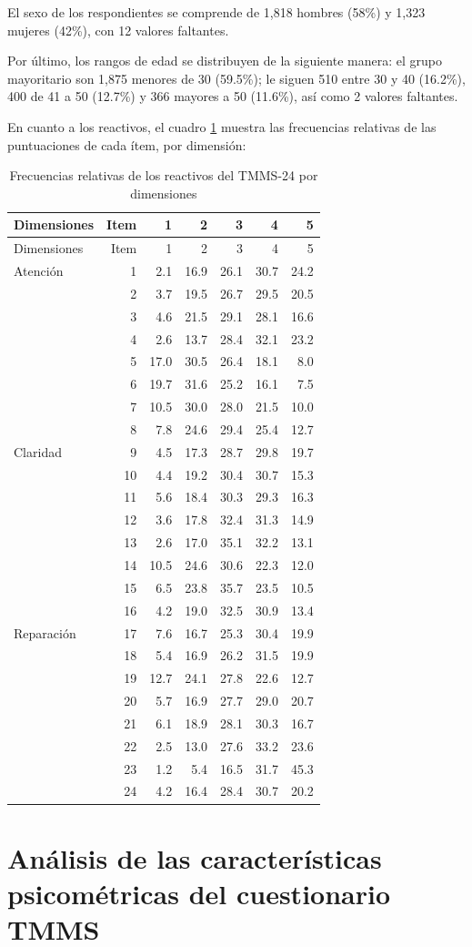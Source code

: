 \documentclass[
  10pt,
  spanish,
]{article}
\begin{document}
El sexo de los respondientes se comprende de 1,818 hombres (58\%) y
1,323 mujeres (42\%), con 12 valores faltantes.

Por último, los rangos de edad se distribuyen de la siguiente manera: el
grupo mayoritario son 1,875 menores de 30 (59.5\%); le siguen 510 entre
30 y 40 (16.2\%), 400 de 41 a 50 (12.7\%) y 366 mayores a 50 (11.6\%),
así como 2 valores faltantes.

En cuanto a los reactivos, el cuadro \ref{tab:tab_tmms} muestra las
frecuencias relativas de las puntuaciones de cada ítem, por dimensión:

\begin{longtable}[]{@{}lrrrrrr@{}}
\caption{Frecuencias relativas de los reactivos del TMMS-24 por
dimensiones\label{tab:tab_tmms}}\tabularnewline
\toprule
Dimensiones & Item & 1 & 2 & 3 & 4 & 5\tabularnewline
\midrule
\endfirsthead
\toprule
Dimensiones & Item & 1 & 2 & 3 & 4 & 5\tabularnewline
\midrule
\endhead
Atención & 1 & 2.1 & 16.9 & 26.1 & 30.7 & 24.2\tabularnewline
& 2 & 3.7 & 19.5 & 26.7 & 29.5 & 20.5\tabularnewline
& 3 & 4.6 & 21.5 & 29.1 & 28.1 & 16.6\tabularnewline
& 4 & 2.6 & 13.7 & 28.4 & 32.1 & 23.2\tabularnewline
& 5 & 17.0 & 30.5 & 26.4 & 18.1 & 8.0\tabularnewline
& 6 & 19.7 & 31.6 & 25.2 & 16.1 & 7.5\tabularnewline
& 7 & 10.5 & 30.0 & 28.0 & 21.5 & 10.0\tabularnewline
& 8 & 7.8 & 24.6 & 29.4 & 25.4 & 12.7\tabularnewline
Claridad & 9 & 4.5 & 17.3 & 28.7 & 29.8 & 19.7\tabularnewline
& 10 & 4.4 & 19.2 & 30.4 & 30.7 & 15.3\tabularnewline
& 11 & 5.6 & 18.4 & 30.3 & 29.3 & 16.3\tabularnewline
& 12 & 3.6 & 17.8 & 32.4 & 31.3 & 14.9\tabularnewline
& 13 & 2.6 & 17.0 & 35.1 & 32.2 & 13.1\tabularnewline
& 14 & 10.5 & 24.6 & 30.6 & 22.3 & 12.0\tabularnewline
& 15 & 6.5 & 23.8 & 35.7 & 23.5 & 10.5\tabularnewline
& 16 & 4.2 & 19.0 & 32.5 & 30.9 & 13.4\tabularnewline
Reparación & 17 & 7.6 & 16.7 & 25.3 & 30.4 & 19.9\tabularnewline
& 18 & 5.4 & 16.9 & 26.2 & 31.5 & 19.9\tabularnewline
& 19 & 12.7 & 24.1 & 27.8 & 22.6 & 12.7\tabularnewline
& 20 & 5.7 & 16.9 & 27.7 & 29.0 & 20.7\tabularnewline
& 21 & 6.1 & 18.9 & 28.1 & 30.3 & 16.7\tabularnewline
& 22 & 2.5 & 13.0 & 27.6 & 33.2 & 23.6\tabularnewline
& 23 & 1.2 & 5.4 & 16.5 & 31.7 & 45.3\tabularnewline
& 24 & 4.2 & 16.4 & 28.4 & 30.7 & 20.2\tabularnewline
\bottomrule
\end{longtable}

\hypertarget{anuxe1lisis-de-las-caracteruxedsticas-psicomuxe9tricas-del-cuestionario-tmms}{%
\section{Análisis de las características psicométricas del cuestionario
TMMS}\label{anuxe1lisis-de-las-caracteruxedsticas-psicomuxe9tricas-del-cuestionario-tmms}}
\end{document}
